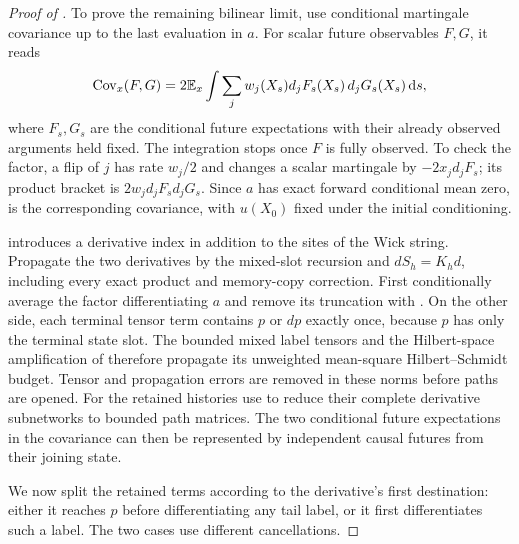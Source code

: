 \begin{proof}[Proof of ]
To prove the remaining bilinear limit, use conditional martingale
covariance up to the last evaluation in $a$. For scalar future
observables $F,G$, it reads
\begin{equation}\label{eq:hidden-martingale-covariance}
 \operatorname{Cov}_x(F,G)
 =2\mathbb E_x\int\sum_j w_j(X_s)
              d_jF_s(X_s)\,d_jG_s(X_s)\,\mathrm d s,
\end{equation}
where $F_s,G_s$ are the conditional future expectations with their
already observed arguments held fixed. The integration stops once
$F$ is fully observed. To check the factor, a flip of $j$ has rate
$w_j/2$ and changes a scalar martingale by $-2x_jd_jF_s$; its product
bracket is $2w_jd_jF_s d_jG_s$. Since $a$ has exact forward conditional
mean zero,  is the corresponding
covariance, with $u(X_0)$ fixed under the initial conditioning.

 introduces a derivative
index in addition to the sites of the Wick string. Propagate the two
derivatives by the mixed-slot recursion and $dS_h=K_hd$, including
every exact product and memory-copy correction. First conditionally average the factor differentiating $a$ and
remove its truncation with .
On the other side, each terminal tensor term contains $p$ or $dp$
exactly once, because $p$ has only the terminal state slot. The bounded mixed label tensors and the Hilbert-space
amplification of  therefore propagate its
unweighted mean-square Hilbert--Schmidt budget. Tensor and
propagation errors are removed in these norms before paths are
opened. For the retained histories use
 to reduce their complete
derivative subnetworks to bounded path matrices. The two conditional
future expectations in
the covariance can then be represented by independent causal futures
from their joining state.

We now split the retained terms according to the derivative's first
destination: either it reaches $p$ before differentiating any tail
label, or it first differentiates such a label. The two cases use
different cancellations.


\end{proof}
